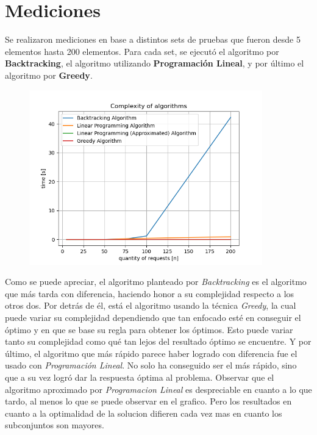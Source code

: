 \section{Mediciones}

Se realizaron mediciones en base a distintos sets de pruebas que fueron desde 5 elementos hasta 200 elementos. Para cada set, se ejecutó el algoritmo por \textbf{Backtracking}, el algoritmo utilizando \textbf{Programación Lineal}, y por último el algoritmo por \textbf{Greedy}.

\begin{figure}[H]
	\centering
	\includegraphics[width=0.9\textwidth]{img/graphic.png}
\end{figure}

Como se puede apreciar, el algoritmo planteado por \textit{Backtracking} es el algoritmo que más tarda con diferencia, haciendo honor a su complejidad respecto a los otros dos. Por detrás de él, está el algoritmo usando la técnica \textit{Greedy}, la cual puede variar su complejidad dependiendo que tan enfocado esté en conseguir el óptimo y en que se base su regla para obtener los óptimos. Esto puede variar tanto su complejidad como qué tan lejos del resultado óptimo se encuentre. Y por último, el algoritmo que más rápido parece haber logrado con diferencia fue el usado con \textit{Programación Lineal}. No solo ha conseguido ser el más rápido, sino que a su vez logró dar la respuesta óptima al problema. Observar que el algoritmo aproximado por \textit{Programacion Lineal} es despreciable en cuanto a lo que tardo, al menos lo que se puede observar en el grafico. Pero los resultados en cuanto a la optimalidad de la solucion difieren cada vez mas en cuanto los subconjuntos son mayores.
